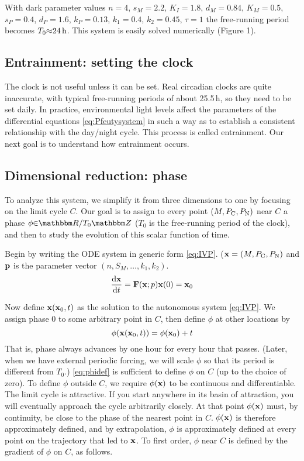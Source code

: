 With dark parameter values  $n=4$,  ${s}_{M}=2.2$,  ${K}_{I}=1.8$, 
${d}_{M}=0.84$,  ${K}_{M}=0.5$,  ${s}_{P}=0.4$,  ${d}_{P}=1.6$, 
${k}_{P}=0.13$,  ${k}_{1}=0.4$,  ${k}_{2}=0.45$,  $\tau =1$ the
free-running period becomes  ${T}_{0}{\approx}\unit[24]{h}$. This system is
easily solved numerically (Figure 1). 

\subsection{Entrainment: setting the clock}
The clock is not useful unless it can be set. Real circadian clocks
are quite inaccurate, with typical free-running periods of about
25.5\,h, so they need to be set daily. In practice, environmental
light levels affect the parameters of the differential equations \eqref{eq:Pfeutysystem} in
such a way as to establish a consistent relationship with the
day/night cycle. This process is called entrainment. Our next goal is
to understand how entrainment occurs. 

\subsection{Dimensional reduction: phase}
To analyze this system, we simplify it from three dimensions to one by
focusing on the limit cycle  $C$. Our goal is to assign to every
point  $(M,P_{\text{C}},P_{\text{N}})$ near  $C$ a phase  $\phi{\in}\R/{T}_{0}\Z$
(${T}_{0}$ is the free-running period of the clock), and then to study
the evolution of this scalar function of time. 

Begin by writing the ODE system in generic form
\eqref{eq:IVP}. ($\vb{x}=(M,P_{\text{C}},P_{\text{N}})$ and $\vb{p}$ is the parameter vector
$(n,{S}_{M},{\dots},{k}_{1},{k}_{2})$.  
\begin{equation}\label{eq:IVP}
\dv{\vb{x}}{t}=\vb{F}(\vb{x};p)
\vb{x}(0)={\vb{x}}_{0}
\end{equation}

Now define  $\vb{x}({\vb{x}}_{0},t)$ as the solution to the autonomous system
\eqref{eq:IVP}. We assign phase 0 to some arbitrary point in  $C$, then define 
$\phi$ at other locations by 
\begin{equation}\label{eq:phidef}
\phi (\vb{x}({\vb{x}}_{0},t))=\phi
({\vb{x}}_{0})+t
\end{equation}
That is, phase always advances by one hour for every hour that passes.
(Later, when we have external periodic forcing, we will scale 
$\phi$ so that its period is different from  ${T}_{0}$.) \eqref{eq:phidef} is
sufficient to define  $\phi$ on  $C$ (up to the choice of zero).
To define  $\phi$ outside  $C$, we require  $\phi(\vb{x})$ to be
continuous and differentiable. The limit cycle is attractive. If you
start anywhere in its basin of attraction, you will eventually
approach the cycle arbitrarily closely. At that point  $\phi(\vb{x})$
must, by continuity, be close to the phase of the nearest point in 
$C$.  $\phi(\vb{x})$ is therefore approximately defined, and by
extrapolation,  $\phi$ is approximately defined at every point on
the trajectory that led to  $\vb{x}$. To first order,  $\phi$ near 
$C$ is defined by the gradient of  $\phi$ on  $C$, as follows. 

